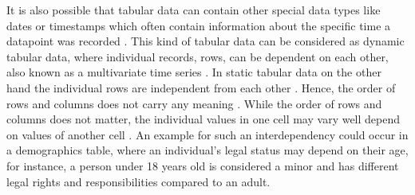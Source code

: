 It is also possible that tabular data can contain other special data types like dates or timestamps which often contain information about the specific time a datapoint was recorded \cite{hernandez2022SyntheticDataGeneration}.
This kind of tabular data can be considered as dynamic tabular data, where individual records, \ie rows, can be dependent on each other, also known as a multivariate time series \cite{padhi2021TabularTransformersModeling}.
In static tabular data on the other hand the individual rows are independent from each other \cite{padhi2021TabularTransformersModeling}.
Hence, the order of rows and columns does not carry any meaning \cite{somepalli2021SAINTImprovedNeural}.
While the order of rows and columns does not matter, the individual values in one cell may vary well depend on values of another cell \cite{lederrey2022DATGANIntegratingExperta}.
An example for such an interdependency could occur in a demographics table, where an individual's legal status may depend on their age, 
for instance, a person under 18 years old is considered a minor and has different legal rights and responsibilities compared to an adult.

